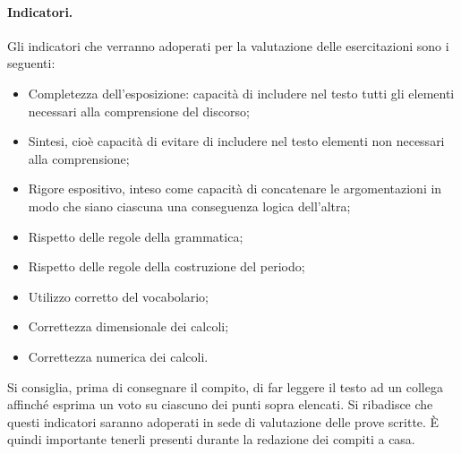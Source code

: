 \documentclass[12pt]{article}
\begin{document}
\paragraph{Indicatori.} Gli indicatori che verranno adoperati per la valutazione delle esercitazioni sono i seguenti:
\begin{itemize}
\item Completezza dell'esposizione: capacit\`a di includere nel testo tutti gli elementi necessari alla comprensione del discorso;
\item Sintesi, cio\`e capacit\`a di evitare di includere nel testo elementi non necessari alla comprensione;
\item Rigore espositivo, inteso come capacit\`a di concatenare le argomentazioni in modo che siano ciascuna una conseguenza logica dell'altra;
\item Rispetto delle regole della grammatica;
\item Rispetto delle regole della costruzione del periodo;
\item Utilizzo corretto del vocabolario;
\item Correttezza dimensionale dei calcoli;
\item Correttezza numerica dei calcoli.
\end{itemize} 
Si consiglia, prima di consegnare il compito, di far leggere il testo ad un collega affinch\'e  esprima un voto su ciascuno dei punti sopra elencati. Si ribadisce che questi indicatori saranno adoperati in sede di valutazione delle prove scritte. \`E quindi importante tenerli presenti durante la redazione dei compiti a casa.
\end{document}
